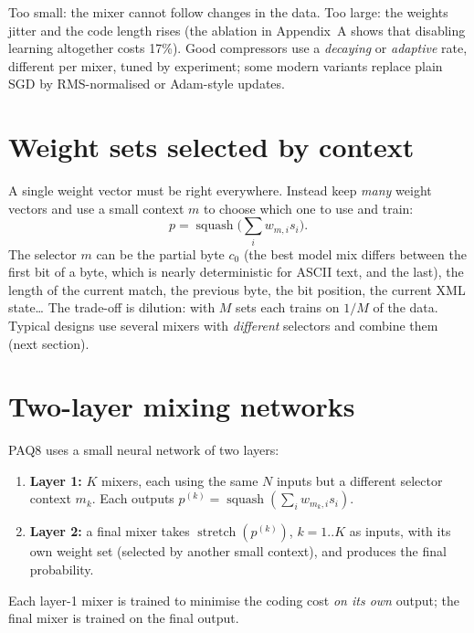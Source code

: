 \documentclass[11pt,a4paper,openany]{book}
\newcommand{\st}{\operatorname{stretch}}
\newcommand{\sq}{\operatorname{squash}}
\theoremstyle{definition}
\theoremstyle{remark}
\begin{document}
\begin{pitfall}
Too small: the mixer cannot follow changes in the data. Too large: the weights jitter and the code length rises (the ablation in Appendix~A shows that disabling learning altogether costs 17\%). Good compressors use a \emph{decaying} or \emph{adaptive} rate, different per mixer, tuned by experiment; some modern variants replace plain SGD by RMS-normalised or Adam-style updates.
\end{pitfall}

\section{Weight sets selected by context}

A single weight vector must be right everywhere. Instead keep \emph{many} weight vectors and use a small context $m$ to choose which one to use and train:
\[
p=\sq\Big(\sum_iw_{m,i}s_i\Big).
\]
The selector $m$ can be the partial byte $c_0$ (the best model mix differs between the first bit of a byte, which is nearly deterministic for ASCII text, and the last), the length of the current match, the previous byte, the bit position, the current XML state\ldots{} The trade-off is dilution: with $M$ sets each trains on $1/M$ of the data. Typical designs use several mixers with \emph{different} selectors and combine them (next section).

\section{Two-layer mixing networks}

PAQ8 uses a small neural network of two layers:
\begin{enumerate}
\item \textbf{Layer 1:} $K$ mixers, each using the same $N$ inputs but a different selector context $m_k$. Each outputs $p^{(k)}=\sq(\sum_iw_{m_k,i}s_i)$.
\item \textbf{Layer 2:} a final mixer takes $\st(p^{(k)})$, $k=1..K$ as inputs, with its own weight set (selected by another small context), and produces the final probability.
\end{enumerate}
Each layer-1 mixer is trained to minimise the coding cost \emph{on its own} output; the final mixer is trained on the final output.
\end{document}

